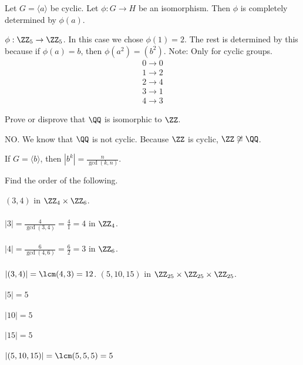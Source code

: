 \documentclass[class=scrartcl, crop=false]{standalone}
\begin{document}
\begin{remark}
  Let $G = \langle a \rangle $ be cyclic. Let $\phi:G \to H$ be an isomorphism. Then $\phi$ is completely determined by $\phi(a)$.
\end{remark}
\begin{example}
  $\phi:\ZZ_5\to\ZZ_5$. In this case we chose $\phi(1) = 2$. The rest is determined by this because if $\phi(a) = b$, then $\phi(a^2) = (b^2)$. Note: Only for cyclic groups.
  \begin{gather*}
    0 \to 0 \\
    1 \to 2 \\
    2 \to 4 \\
    3 \to 1 \\
    4 \to 3
  \end{gather*}
\end{example}

\begin{example}
  Prove or disprove that $\QQ$ is isomorphic to $\ZZ$.
  \begin{answer}
    NO. We know that $\QQ$ is not cyclic. Because $\ZZ$ is cyclic, $\ZZ \not\cong \QQ$.
  \end{answer}
\end{example}

\begin{recall}
  If $G = \langle b \rangle $, then $|b^k| = \frac{n}{\gcd(k,n)}$.
\end{recall}
\begin{exercise}
  Find the order of the following.
  \begin{enumerate}[label=(\alph*)]
    \ii
    $(3,4)$ in $\ZZ_4\times\ZZ_6$.
    \\\\
    $|3| = \frac{4}{\gcd(3,4)} = \frac{4}{1} = 4$ in $\ZZ_4$.
    \\\\
    $|4| = \frac{6}{\gcd(4,6)} = \frac{6}{2} = 3$ in $\ZZ_6$.
    \\\\
    $|(3,4)| = \lcm(4,3) = 12$.
    \ii
    $(5, 10, 15)$ in $\ZZ_{25} \times \ZZ_{25} \times \ZZ_{25}$.
    \\\\
    $|5| = 5$
    \\\\
    $|10| = 5$ 
    \\\\
    $|15| = 5$ 
    \\\\
    $|(5,10,15)| = \lcm(5,5,5) = 5$
  \end{enumerate}
\end{exercise}
\end{document}
